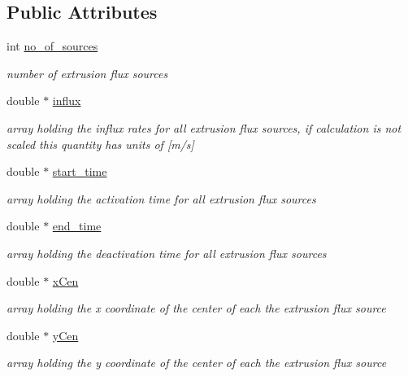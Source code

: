 \subsection*{Public Attributes}
\begin{CompactItemize}
\item 
int \hyperlink{structFluxProps_o0}{no\_\-of\_\-sources}
\begin{CompactList}\small\item\em number of extrusion flux sources \item\end{CompactList}\item 
double $\ast$ \hyperlink{structFluxProps_o1}{influx}
\begin{CompactList}\small\item\em array holding the influx rates for all extrusion flux sources, if calculation is not scaled this quantity has units of \mbox{[}m/s\mbox{]} \item\end{CompactList}\item 
double $\ast$ \hyperlink{structFluxProps_o2}{start\_\-time}
\begin{CompactList}\small\item\em array holding the activation time for all extrusion flux sources \item\end{CompactList}\item 
double $\ast$ \hyperlink{structFluxProps_o3}{end\_\-time}
\begin{CompactList}\small\item\em array holding the deactivation time for all extrusion flux sources \item\end{CompactList}\item 
double $\ast$ \hyperlink{structFluxProps_o4}{x\-Cen}
\begin{CompactList}\small\item\em array holding the x coordinate of the center of each the extrusion flux source \item\end{CompactList}\item 
double $\ast$ \hyperlink{structFluxProps_o5}{y\-Cen}
\begin{CompactList}\small\item\em array holding the y coordinate of the center of each the extrusion flux source \item\end{CompactList}\item 

\end{CompactItemize}
